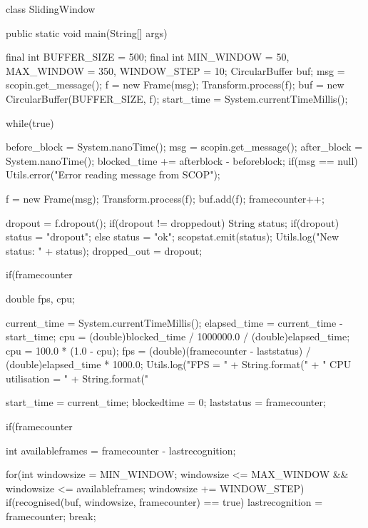 \documentclass[12pt,a4,notitlepage]{report}
\renewcommand{\_}{\texttt{\symbol{95}}}
\newcommand{\<}{\texttt{\symbol{60}}}
\renewcommand{\>}{\texttt{\symbol{62}}}
\begin{document}
\begin{code}
class SlidingWindow
{
   public static void main(String[] args)
   {
      final int BUFFER_SIZE = 500;
      final int MIN_WINDOW = 50, MAX_WINDOW = 350, WINDOW_STEP = 10;
      CircularBuffer buf;
      msg = scopin.get_message();
      f = new Frame(msg);
      Transform.process(f);
      buf = new CircularBuffer(BUFFER_SIZE, f);
      start_time = System.currentTimeMillis();
      
      while(true)
      {
         before_block = System.nanoTime();
         msg = scopin.get_message();
         after_block = System.nanoTime();
         blocked_time += after\_block - before\_block;
         if(msg == null)
            Utils.error("Error reading message from SCOP");
         
         f = new Frame(msg);
         Transform.process(f);
         buf.add(f);
         framecounter++;
         
         dropout = f.dropout();
         if(dropout != dropped\_out)
         {
            String status;
            if(dropout)
               status = "dropout";
            else
               status = "ok";
            scopstat.emit(status);
            Utils.log("New status: " + status);
            dropped_out = dropout;
         }
         
         if(framecounter %
         {
            double fps, cpu;
            
            current_time = System.currentTimeMillis();
            elapsed_time = current_time - start_time;
            cpu = (double)blocked_time / 1000000.0 / (double)elapsed_time;
            cpu = 100.0 * (1.0 - cpu);
            fps = (double)(framecounter - laststatus) / (double)elapsed_time
                  * 1000.0;
            Utils.log("FPS = " + String.format("%
                + " CPU utilisation = " + String.format("%
            
            start_time = current_time;
            blocked\_time = 0;
            laststatus = framecounter;
         }
         if(framecounter %
         {
            int availableframes = framecounter - lastrecognition;
            
            for(int windowsize = MIN_WINDOW; windowsize <= MAX_WINDOW &&
                  windowsize <= availableframes; windowsize += WINDOW_STEP)
            {
               if(recognised(buf, windowsize, framecounter) == true)
               {
                  lastrecognition = framecounter;
                  break;
               }
            }
         }
      }

}}
\end{code}
\end{document}
